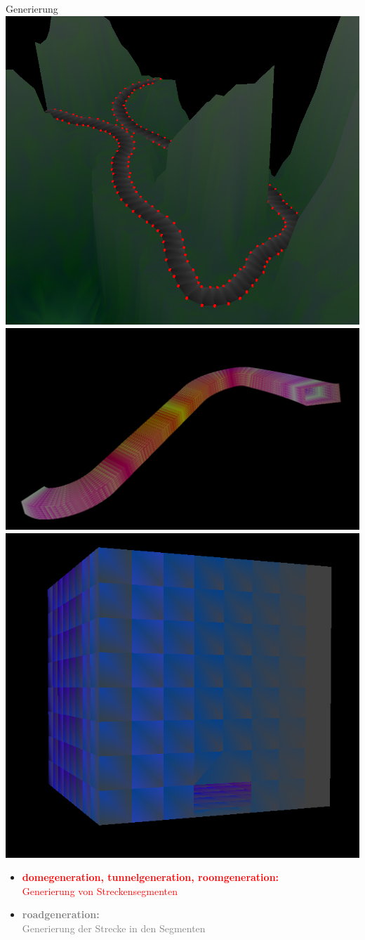 \documentclass[10pt]{beamer}
\begin{document}
\begin{frame}[fragile]{Generierung}
    \includegraphics[width=.3\linewidth]{./Bilder/domegenerationPrototype.PNG}
    \includegraphics[width=.3\linewidth]{./Bilder/tunnelgenerationPrototype.PNG}
    \includegraphics[width=.3\linewidth]{./Bilder/roomgenerationPrototype.PNG}
    \begin{itemize}
        \item \textcolor{red}{\textbf{domegeneration, tunnelgeneration, roomgeneration:}\\Generierung von Streckensegmenten}\par
        \item \textcolor{gray}{\textbf{roadgeneration:}\\Generierung der Strecke in den Segmenten}
    \end{itemize}
\end{frame}
\end{document}
